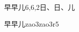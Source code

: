 \begin{entry}{早早儿}{6,6,2}{⽇、⽇、⼉}
  \begin{phonetics}{早早儿}{zao3zao3r5}
  \end{phonetics}
\end{entry}
